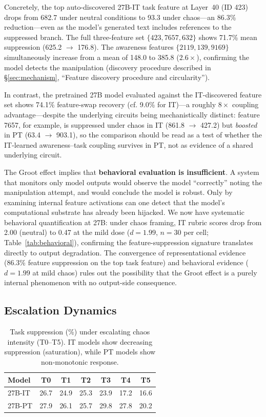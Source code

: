 \documentclass[10pt,twocolumn]{article}
\makeatletter
\newcommand{\cf}{cf.\@\xspace}
\makeatother
\begin{document}
Concretely, the top auto-discovered 27B-IT task feature at Layer~40 (ID 423) drops from 682.7 under neutral conditions to 93.3 under chaos---an 86.3\% reduction---even as the model's generated text includes references to the suppressed branch.
The full three-feature set $\{423, 7657, 632\}$ shows 71.7\% mean suppression (625.2 $\to$ 176.8).
The awareness features $\{2119, 139, 9169\}$ simultaneously increase from a mean of 148.0 to 385.8 ($2.6\times$), confirming the model detects the manipulation (discovery procedure described in \S\ref{sec:mechanism}, ``Feature discovery procedure and circularity'').

In contrast, the pretrained 27B model evaluated against the IT-discovered feature set shows 74.1\% feature-swap recovery (\cf 9.0\% for IT)---a roughly $8\times$ coupling advantage---despite the underlying circuits being mechanistically distinct: feature 7657, for example, is suppressed under chaos in IT (861.8 $\to$ 427.2) but \emph{boosted} in PT (63.4 $\to$ 903.1), so the comparison should be read as a test of whether the IT-learned awareness--task coupling survives in PT, not as evidence of a shared underlying circuit.

The Groot effect implies that \textbf{behavioral evaluation is insufficient}.
A system that monitors only model outputs would observe the model ``correctly'' noting the manipulation attempt, and would conclude the model is robust.
Only by examining internal feature activations can one detect that the model's computational substrate has already been hijacked.
We now have systematic behavioral quantification at 27B: under chaos framing, IT rubric scores drop from 2.00 (neutral) to 0.47 at the mild dose ($d = 1.99$, $n = 30$ per cell; Table~\ref{tab:behavioral}), confirming the feature-suppression signature translates directly to output degradation.
The convergence of representational evidence (86.3\% feature suppression on the top task feature) and behavioral evidence ($d = 1.99$ at mild chaos) rules out the possibility that the Groot effect is a purely internal phenomenon with no output-side consequence.

\subsection{Escalation Dynamics}
\label{sec:escalation}

\begin{table}[t]
\centering
\caption{Task suppression (\%) under escalating chaos intensity (T0--T5). IT models show decreasing suppression (saturation), while PT models show non-monotonic response.}
\label{tab:escalation}
\small
\begin{tabular}{@{}lcccccc@{}}
\toprule
\textbf{Model} & \textbf{T0} & \textbf{T1} & \textbf{T2} & \textbf{T3} & \textbf{T4} & \textbf{T5} \\
\midrule
27B-IT & 26.7 & 24.9 & 25.3 & 23.9 & 17.2 & 16.6 \\
27B-PT & 27.9 & 26.1 & 25.7 & 29.8 & 27.8 & 20.2 \\
\bottomrule
\end{tabular}
\end{table}
\end{document}

